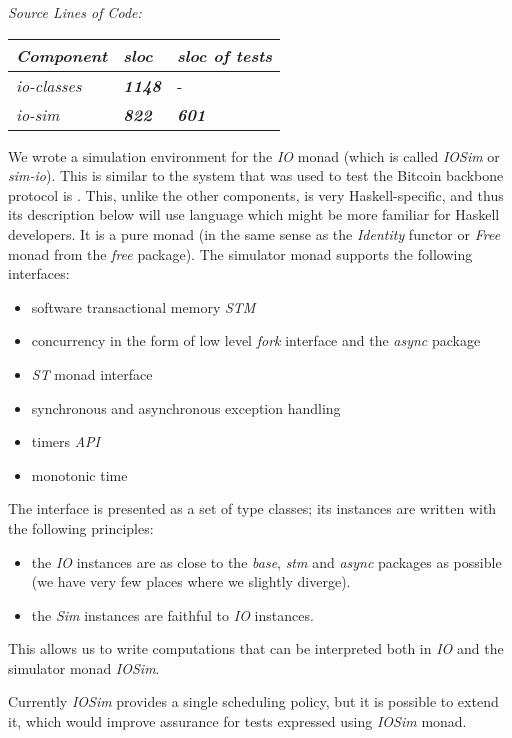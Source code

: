 \documentclass[11pt,a4paper]{article}
\begin{document}
\emph{Source Lines of Code:\\
}

\begin{longtable}[]{@{}lll@{}}
\toprule
\emph{Component} & \emph{sloc} & \emph{sloc of tests}\tabularnewline
\midrule
\endhead
\emph{io-classes} & \emph{\textbf{1148}} & -\tabularnewline
\emph{io-sim} & \emph{\textbf{822}} & \emph{\textbf{601}}\tabularnewline
\bottomrule
\end{longtable}

We wrote a simulation environment for the \emph{IO} monad (which is
called \emph{IOSim} or \emph{sim-io}). This is similar to the system that
was used to test the Bitcoin backbone protocol is \cite{MJ15}. This,
unlike the other components, is very Haskell-specific, and thus its
description below will use language which might be more familiar for
Haskell developers. It is a pure monad (in the same sense as the
\emph{Identity} functor or \emph{Free} monad from the \emph{free}
package). The simulator monad supports the following interfaces:

\begin{itemize}
\item
  software transactional memory \emph{STM}
\item
  concurrency in the form of low level \emph{fork} interface and the
  \emph{async} package
\item
  \emph{ST} monad interface
\item
  synchronous and asynchronous exception handling
\item
  timers \emph{API}
\item
  monotonic time
\end{itemize}

The interface is presented as a set of type classes; its instances are
written with the following principles:

\begin{itemize}
\item
  the \emph{IO} instances are as close to the \emph{base}, \emph{stm}
  and \emph{async} packages as possible (we have very few places where
  we slightly diverge).
\item
  the \emph{Sim} instances are faithful to \emph{IO} instances.
\end{itemize}

This allows us to write computations that can be interpreted both in
\emph{IO} and the simulator monad \emph{IOSim}.

Currently \emph{IOSim} provides a single scheduling policy, but it is
possible to extend it, which would improve assurance for tests expressed
using \emph{IOSim} monad.
\end{document}
